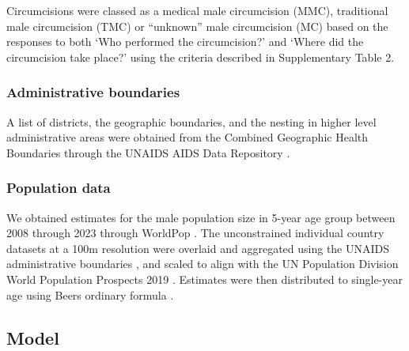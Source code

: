 \documentclass{article}
\begin{document}
Circumcisions were classed as a medical male circumcision (MMC), traditional male circumcision (TMC) or “unknown” male circumcision (MC) based on the responses to both ‘Who performed the circumcision?’ and ‘Where did the circumcision take place?’ using the criteria described in Supplementary Table 2. 


\subsubsection*{Administrative boundaries }


A list of districts, the geographic boundaries, and the nesting in higher level administrative areas were obtained from the Combined Geographic Health Boundaries through the UNAIDS AIDS Data Repository \cite{UNAIDSADR}. 


\subsubsection*{Population data}


We obtained estimates for the male population size in 5-year age group between 2008 through 2023 through WorldPop \cite{worldpop}. The unconstrained individual country datasets at a 100m resolution were overlaid and aggregated using the UNAIDS administrative boundaries \cite{UNAIDSADR}, and scaled to align with the UN Population Division World Population Prospects 2019 \cite{wpp}. Estimates were then distributed to single-year age using Beers ordinary formula \cite{beersmethod, beers}. 


\subsection*{Model}

\end{document}
